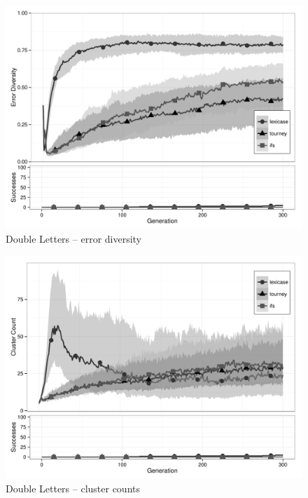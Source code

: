 \begin{figure}[p] %
\centering
\includegraphics[width=11.5cm]{double-letters-diversity.pdf}
\caption{Double Letters -- error diversity}
\label{double-lettersDiv}
\end{figure}

\begin{figure}[p] %
\centering
\includegraphics[width=11.5cm]{double-letters-cluster.pdf}
\caption{Double Letters -- cluster counts}
\label{double-lettersClu}
\end{figure}

